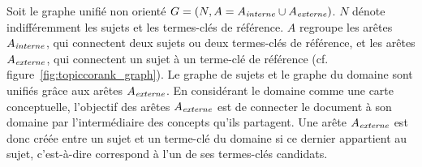         Soit le graphe unifié non orienté $G = (N, A =
        A_{\textnormal{\textit{interne}}} \cup
        A_{\textnormal{\textit{externe}}})$. $N$ dénote indifféremment les
        sujets et les termes-clés de référence. $A$ regroupe les arêtes
        $A_{\textnormal{\textit{interne}}}$, qui connectent deux sujets ou deux
        termes-clés de référence, et les arêtes
        $A_{\textnormal{\textit{externe}}}$, qui connectent un sujet à un
        terme-clé de référence (cf. figure~\ref{fig:topiccorank_graph}). Le
        graphe de sujets et le graphe du domaine sont unifiés grâce aux arêtes
        $A_{\textnormal{\textit{externe}}}$.
        En considérant le domaine comme une carte conceptuelle, l'objectif des
        arêtes $A_{\textnormal{\textit{externe}}}$ est de connecter le document
        à son domaine par l'intermédiaire des concepts qu'ils partagent. Une
        arête $A_{\textnormal{\textit{externe}}}$ est donc créée entre un sujet
        et un terme-clé du domaine si ce dernier appartient au sujet,
        c'est-à-dire correspond à l'un de ses termes-clés candidats.
